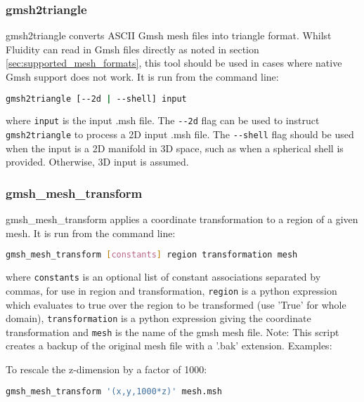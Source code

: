 
\subsubsection{gmsh2triangle}
\label{sec:gmsh2triangle}
gmsh2triangle converts ASCII Gmsh mesh files into triangle format. Whilst Fluidity
can read in Gmsh files directly as noted in section \ref{sec:supported_mesh_formats}, 
this tool should be used in cases where native Gmsh support does not work.
It is run from the command line:
\begin{lstlisting}[language = Bash]
gmsh2triangle [--2d | --shell] input
\end{lstlisting}
where \lstinline[language = Bash]+input+ is the input .msh file.
The \lstinline[language = Bash]+--2d+ flag can be used to instruct \lstinline+gmsh2triangle+
to process a 2D input .msh file. 
The \lstinline[language = Bash]+--shell+ flag should be used when the input is a 2D
manifold in 3D space, such as when a spherical shell is provided. Otherwise, 3D input is assumed.


\subsubsection{gmsh\_mesh\_transform}
\label{sec:gmsh_mesh_transform}

gmsh\_mesh\_transform applies a coordinate transformation to a region of a given mesh. It is run from the command line:
\begin{lstlisting}[language = Bash]
gmsh_mesh_transform [constants] region transformation mesh
\end{lstlisting}
where \lstinline[language = Bash]+constants+ is an optional list of constant associations separated by commas, for use in region and transformation, \lstinline[language = Bash]+region+ is a python expression which evaluates to true over the region to be transformed (use 'True' for whole domain), \lstinline[language = Bash]+transformation+ is a python expression giving the coordinate transformation and \lstinline[language = Bash]+mesh+ is the name of the gmsh mesh file.
Note: This script creates a backup of the original mesh file with a '.bak' extension.
Examples:

To rescale the z-dimension by a factor of 1000:
\begin{lstlisting}[language = Bash]
gmsh_mesh_transform '(x,y,1000*z)' mesh.msh
\end{lstlisting} 

